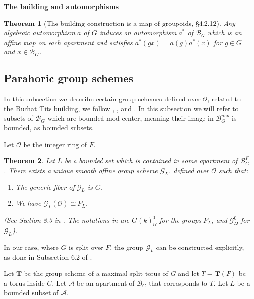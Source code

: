 \documentclass[12pt]{article}
\newcommand{\A}{\mathcal{A}}
\newcommand{\B}{\mathcal{B}}
\newcommand{\s}{\mathcal{O}}
\newcommand{\<}{\langle}
\renewcommand{\>}{\rangle}
\theoremstyle{plain}
\newtheorem{theorem}{Theorem}[section] %
\theoremstyle{definition}
\begin{document}
\textbf{The building and automorphisms}


\begin{theorem}[The building construction is a map of groupoids, \cite{PMIHES_1984__60__5_0} §4.2.12]\label{2.17}
 Any algebraic automorphism $a$ of $G$ induces an automorphism $a^*$ of $\B_G$ which is an affine map on each apartment and satisfies $a^*(gx)=a(g)a^*(x)$ for $g\in G$ and $x\in \B_G$.

\end{theorem}




\subsection{Parahoric group schemes}\label{s2.3}
    In this subsection we describe certain group schemes defined over $\s$, related to the Burhat Tits building, we follow \cite{Tits1979ReductiveGO}, \cite{McNinch2010LeviDO}, \cite{Landvogt1995ACO} and \cite{BruhatTitsTA}. In this subsection we will refer to subsets of $\B_G$ which are bounded mod center, meaning their image in $\B_G^{nen}$ is bounded, as bounded subsets.

    Let $\s$ be the integer ring of $F$.

    \begin{theorem}
    Let $L$ be a bounded set which is contained in some apartment of $\B^F_G$.
        There exists a unique smooth affine group scheme ${\mathcal G}_L$, defined over $\s$ such that:
        \begin{enumerate}
            \item The generic fiber of ${\mathcal G}_L$ is $G$.
            \item We have ${\mathcal G}_L(\s)\cong P_L$.
        \end{enumerate}

        (See Section 8.3 in \cite{BruhatTitsTA}. The notations in \cite{BruhatTitsTA} are $G(k)^0_\Omega$ for the groups $P_L$, and $\mathscr{G}^0_\Omega$ for ${\mathcal G}_L$).
    \end{theorem}

In our case, where $G$ is split over $F$, the group ${\mathcal G}_L$ can be constructed explicitly, as done in Subsection 6.2 of \cite{McNinch2010LeviDO}.

Let $\mathbf{T}$ be the group scheme of a maximal split torus of $G$ and let $T=\mathbf{T}(F)$ be a torus inside $G$. Let $\A$ be an apartment of $\B_G$ that corresponds to $T$. Let $L$ be a bounded subset of $\A$.
\end{document}
